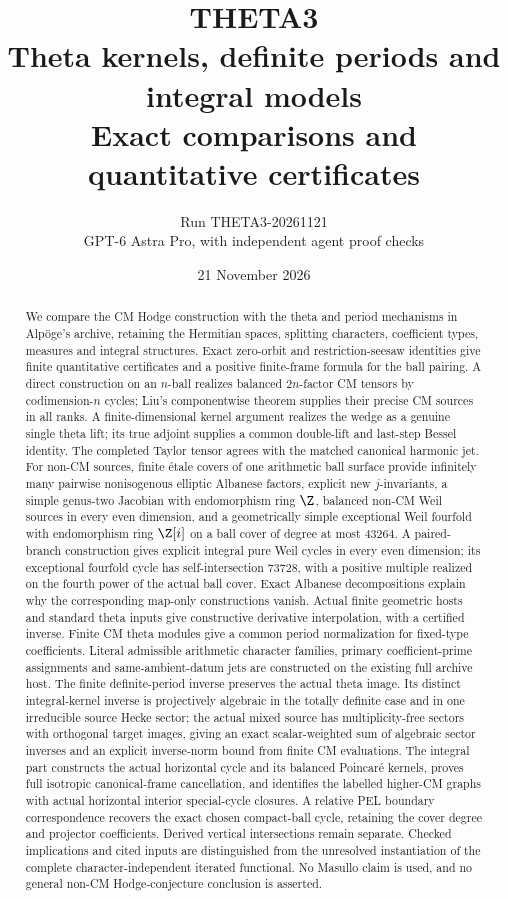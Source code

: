 \documentclass[11pt]{article}
\title{THETA3\\Theta kernels, definite periods and integral models\\\large Exact comparisons and quantitative certificates}
\author{Run THETA3-20261121\\GPT-6 Astra Pro, with independent agent proof checks}
\date{21 November 2026}
\theoremstyle{definition}\newtheorem{definition}[theorem]{Definition}\newtheorem{remark}[theorem]{Remark}
\begin{document}
\maketitle
\begin{abstract}
We compare the CM Hodge construction with the theta and period mechanisms in Alp\"oge's archive, retaining the Hermitian spaces, splitting characters, coefficient types, measures and integral structures. Exact zero-orbit and restriction-seesaw identities give finite quantitative certificates and a positive finite-frame formula for the ball pairing. A direct construction on an $n$-ball realizes balanced $2n$-factor CM tensors by codimension-$n$ cycles; Liu's componentwise theorem supplies their precise CM sources in all ranks. A finite-dimensional kernel argument realizes the wedge as a genuine single theta lift; its true adjoint supplies a common double-lift and last-step Bessel identity. The completed Taylor tensor agrees with the matched canonical harmonic jet. For non-CM sources, finite \'etale covers of one arithmetic ball surface provide infinitely many pairwise nonisogenous elliptic Albanese factors, explicit new $j$-invariants, a simple genus-two Jacobian with endomorphism ring $\Z$, balanced non-CM Weil sources in every even dimension, and a geometrically simple exceptional Weil fourfold with endomorphism ring $\Z[i]$ on a ball cover of degree at most $43264$. A paired-branch construction gives explicit integral pure Weil cycles in every even dimension; its exceptional fourfold cycle has self-intersection $73728$, with a positive multiple realized on the fourth power of the actual ball cover. Exact Albanese decompositions explain why the corresponding map-only constructions vanish. Actual finite geometric hosts and standard theta inputs give constructive derivative interpolation, with a certified inverse. Finite CM theta modules give a common period normalization for fixed-type coefficients. Literal admissible arithmetic character families, primary coefficient-prime assignments and same-ambient-datum jets are constructed on the existing full archive host. The finite definite-period inverse preserves the actual theta image. Its distinct integral-kernel inverse is projectively algebraic in the totally definite case and in one irreducible source Hecke sector; the actual mixed source has multiplicity-free sectors with orthogonal target images, giving an exact scalar-weighted sum of algebraic sector inverses and an explicit inverse-norm bound from finite CM evaluations. The integral part constructs the actual horizontal cycle and its balanced Poincar\'e kernels, proves full isotropic canonical-frame cancellation, and identifies the labelled higher-CM graphs with actual horizontal interior special-cycle closures. A relative PEL boundary correspondence recovers the exact chosen compact-ball cycle, retaining the cover degree and projector coefficients. Derived vertical intersections remain separate. Checked implications and cited inputs are distinguished from the unresolved instantiation of the complete character-independent iterated functional. No Masullo claim is used, and no general non-CM Hodge-conjecture conclusion is asserted.
\end{abstract}
\end{document}

